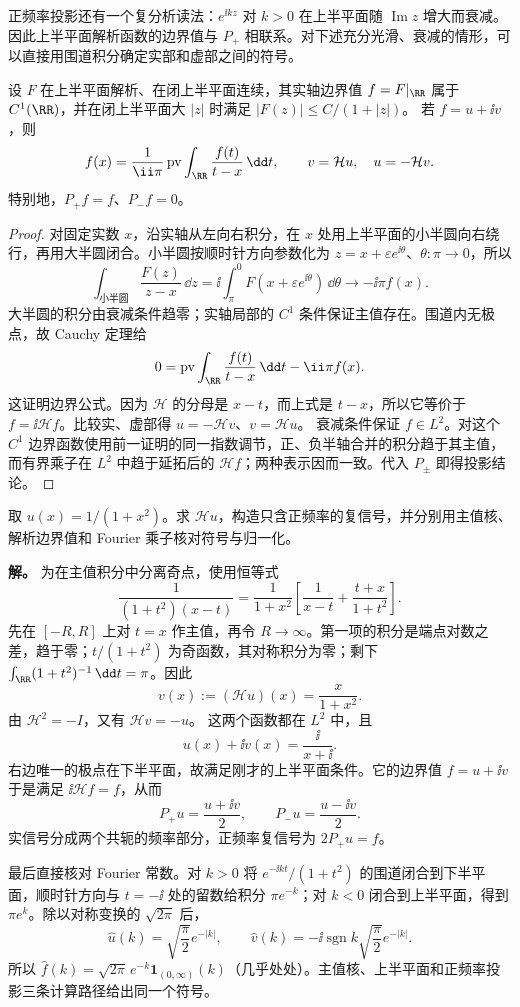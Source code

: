 正频率投影还有一个复分析读法：$e^{\ii kz}$ 对 $k>0$ 在上半平面随 $\operatorname{Im}z$ 增大而衰减。因此上半平面解析函数的边界值与 $P_+$ 相联系。对下述充分光滑、衰减的情形，可以直接用围道积分确定实部和虚部之间的符号。
\begin{proposition}[上半平面边界值的共轭关系]
设 $F$ 在上半平面解析、在闭上半平面连续，其实轴边界值 $f=F|_{\RR}$ 属于 $C^1(\RR)$，并在闭上半平面大 $|z|$ 时满足 $|F(z)|\le C/(1+|z|)$。
若 $f=u+\ii v$，则
\[
f(x)=\frac1{\ii\pi}\operatorname{pv}\int_{\RR}\frac{f(t)}{t-x}\,\dd t,
\qquad v=\mathcal Hu,\quad u=-\mathcal Hv.
\]
特别地，$P_+f=f$、$P_-f=0$。
\end{proposition}
\begin{proof}
对固定实数 $x$，沿实轴从左向右积分，在 $x$ 处用上半平面的小半圆向右绕行，再用大半圆闭合。小半圆按顺时针方向参数化为 $z=x+\varepsilon e^{\ii\theta}$、$\theta:\pi\to0$，所以
\[
\int_{\text{小半圆}}\frac{F(z)}{z-x}\,\dd z
=\ii\int_\pi^0F(x+\varepsilon e^{\ii\theta})\,\dd\theta
\longrightarrow-\ii\pi f(x).
\]
大半圆的积分由衰减条件趋零；实轴局部的 $C^1$ 条件保证主值存在。围道内无极点，故 Cauchy 定理给
\[
0=\operatorname{pv}\int_{\RR}\frac{f(t)}{t-x}\,\dd t-\ii\pi f(x).
\]
这证明边界公式。因为 $\mathcal H$ 的分母是 $x-t$，而上式是 $t-x$，所以它等价于 $f=\ii\mathcal Hf$。比较实、虚部得 $u=-\mathcal Hv$、$v=\mathcal Hu$。
衰减条件保证 $f\in L^2$。对这个 $C^1$ 边界函数使用前一证明的同一指数调节，正、负半轴合并的积分趋于其主值，而有界乘子在 $L^2$ 中趋于延拓后的 $\mathcal Hf$；两种表示因而一致。代入 $P_\pm$ 即得投影结论。
\end{proof}

\begin{workedexample}
取 $u(x)=1/(1+x^2)$。求 $\mathcal Hu$，构造只含正频率的复信号，并分别用主值核、解析边界值和 Fourier 乘子核对符号与归一化。

\textbf{解。} 为在主值积分中分离奇点，使用恒等式
\[
\frac1{(1+t^2)(x-t)}
=\frac1{1+x^2}\left[\frac1{x-t}+\frac{t+x}{1+t^2}\right].
\]
先在 $[-R,R]$ 上对 $t=x$ 作主值，再令 $R\to\infty$。第一项的积分是端点对数之差，趋于零；$t/(1+t^2)$ 为奇函数，其对称积分为零；剩下 $\int_{\RR}(1+t^2)^{-1}\,\dd t=\pi$。因此
\[
v(x):=(\mathcal Hu)(x)=\frac{x}{1+x^2}.
\]
由 $\mathcal H^2=-I$，又有 $\mathcal Hv=-u$。
这两个函数都在 $L^2$ 中，且
\[
u(x)+\ii v(x)=\frac{\ii}{x+\ii}.
\]
右边唯一的极点在下半平面，故满足刚才的上半平面条件。它的边界值 $f=u+\ii v$ 于是满足 $\ii\mathcal Hf=f$，从而
\[
P_+u=\frac{u+\ii v}{2},\qquad P_-u=\frac{u-\ii v}{2}.
\]
实信号分成两个共轭的频率部分，正频率复信号为 $2P_+u=f$。

最后直接核对 Fourier 常数。对 $k>0$ 将 $e^{-\ii kt}/(1+t^2)$ 的围道闭合到下半平面，顺时针方向与 $t=-\ii$ 处的留数给积分 $\pi e^{-k}$；对 $k<0$ 闭合到上半平面，得到 $\pi e^k$。除以对称变换的 $\sqrt{2\pi}$ 后，
\[
\widehat u(k)=\sqrt{\frac\pi2}e^{-|k|},\qquad
\widehat v(k)=-\ii\operatorname{sgn}k\sqrt{\frac\pi2}e^{-|k|}.
\]
所以 $\widehat f(k)=\sqrt{2\pi}\,e^{-k}\mathbf1_{(0,\infty)}(k)$（几乎处处）。主值核、上半平面和正频率投影三条计算路径给出同一个符号。
\end{workedexample}

